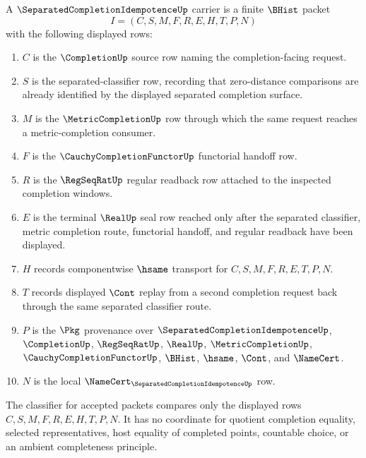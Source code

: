 \begin{definition}
\label{def:separated-completion-idempotence-carrier}
A $\SeparatedCompletionIdempotenceUp$ carrier is a finite $\BHist$ packet
$$
I=(C,S,M,F,R,E,H,T,P,N)
$$
with the following displayed rows:
\begin{enumerate}
\item $C$ is the $\CompletionUp$ source row naming the completion-facing request.
\item $S$ is the separated-classifier row, recording that zero-distance comparisons are already identified by the displayed separated completion surface.
\item $M$ is the $\MetricCompletionUp$ row through which the same request reaches a metric-completion consumer.
\item $F$ is the $\CauchyCompletionFunctorUp$ functorial handoff row.
\item $R$ is the $\RegSeqRatUp$ regular readback row attached to the inspected completion windows.
\item $E$ is the terminal $\RealUp$ seal row reached only after the separated classifier, metric completion route, functorial handoff, and regular readback have been displayed.
\item $H$ records componentwise $\hsame$ transport for $C,S,M,F,R,E,T,P,N$.
\item $T$ records displayed $\Cont$ replay from a second completion request back through the same separated classifier route.
\item $P$ is the $\Pkg$ provenance over $\SeparatedCompletionIdempotenceUp$, $\CompletionUp$, $\RegSeqRatUp$, $\RealUp$, $\MetricCompletionUp$, $\CauchyCompletionFunctorUp$, $\BHist$, $\hsame$, $\Cont$, and $\NameCert$.
\item $N$ is the local $\NameCert_{\SeparatedCompletionIdempotenceUp}$ row.
\end{enumerate}
The classifier for accepted packets compares only the displayed rows $C,S,M,F,R,E,H,T,P,N$. It has no coordinate for quotient completion equality, selected representatives, host equality of completed points, countable choice, or an ambient completeness principle.
\end{definition}

